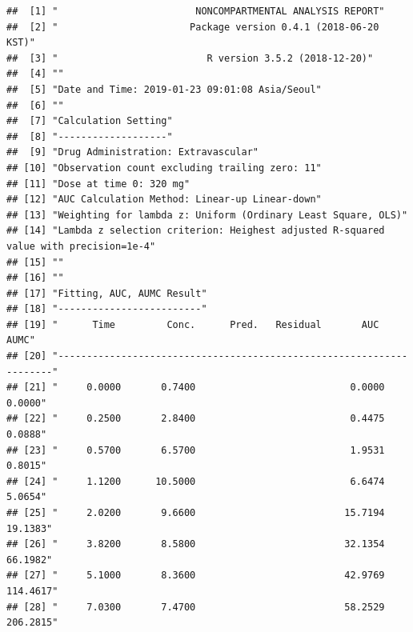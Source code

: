 \documentclass[9pt,]{krantz}
\begin{document}
\begin{verbatim}
##  [1] "                        NONCOMPARTMENTAL ANALYSIS REPORT"                           
##  [2] "                       Package version 0.4.1 (2018-06-20 KST)"                      
##  [3] "                          R version 3.5.2 (2018-12-20)"                             
##  [4] ""                                                                                   
##  [5] "Date and Time: 2019-01-23 09:01:08 Asia/Seoul"                                      
##  [6] ""                                                                                   
##  [7] "Calculation Setting"                                                                
##  [8] "-------------------"                                                                
##  [9] "Drug Administration: Extravascular"                                                 
## [10] "Observation count excluding trailing zero: 11"                                      
## [11] "Dose at time 0: 320 mg"                                                             
## [12] "AUC Calculation Method: Linear-up Linear-down"                                      
## [13] "Weighting for lambda z: Uniform (Ordinary Least Square, OLS)"                       
## [14] "Lambda z selection criterion: Heighest adjusted R-squared value with precision=1e-4"
## [15] ""                                                                                   
## [16] ""                                                                                   
## [17] "Fitting, AUC, AUMC Result"                                                          
## [18] "-------------------------"                                                          
## [19] "      Time         Conc.      Pred.   Residual       AUC       AUMC"                
## [20] "---------------------------------------------------------------------"              
## [21] "     0.0000       0.7400                           0.0000     0.0000"               
## [22] "     0.2500       2.8400                           0.4475     0.0888"               
## [23] "     0.5700       6.5700                           1.9531     0.8015"               
## [24] "     1.1200      10.5000                           6.6474     5.0654"               
## [25] "     2.0200       9.6600                          15.7194    19.1383"               
## [26] "     3.8200       8.5800                          32.1354    66.1982"               
## [27] "     5.1000       8.3600                          42.9769   114.4617"               
## [28] "     7.0300       7.4700                          58.2529   206.2815"               

\end{verbatim}
\end{document}
